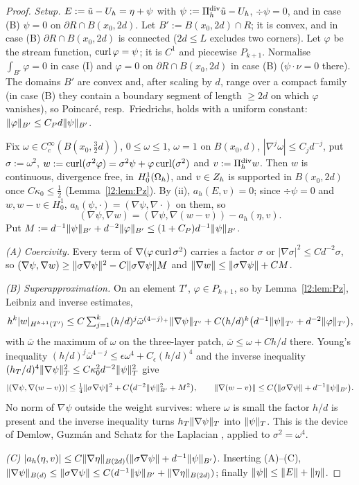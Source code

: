 \begin{proof}
\emph{Setup.} $E:=\tilde u-U_h=\eta+\psi$ with $\psi:=\Pi^{\rm div}_h\tilde u-U_h$, $\div\psi=0$, and in case (B) $\psi=0$ on $\partial R\cap B(x_0,2d)$. Let $B':=B(x_0,2d)\cap R$; it is convex, and in case (B) $\partial R\cap B(x_0,2d)$ is connected ($2d\le L$ excludes two corners). Let $\varphi$ be the stream function, $\operatorname{curl}\varphi=\psi$; it is $C^1$ and piecewise $P_{k+1}$. Normalise $\int_{B'}\varphi=0$ in case (I) and $\varphi=0$ on $\partial R\cap B(x_0,2d)$ in case (B) ($\psi\cdot\nu=0$ there). The domains $B'$ are convex and, after scaling by $d$, range over a compact family (in case (B) they contain a boundary segment of length $\ge2d$ on which $\varphi$ vanishes), so Poincar\'e, resp.\ Friedrichs, holds with a uniform constant: $\lVert \varphi\rVert_{B'}\le C_Pd\lVert \psi\rVert_{B'}$.

Fix $\omega\in C^\infty_c(B(x_0,\frac32d))$, $0\le\omega\le1$, $\omega=1$ on $B(x_0,d)$, $|\nabla^j\omega|\le C_jd^{-j}$, put $\sigma:=\omega^2$, $w:=\operatorname{curl}(\sigma^2\varphi)=\sigma^2\psi+\varphi\operatorname{curl}(\sigma^2)$ and $v:=\Pi^{\rm div}_hw$. Then $w$ is continuous, divergence free, in $H^1_0(\Omega_h)$, and $v\in Z_h$ is supported in $B(x_0,2d)$ once $C\kappa_0\le\frac12$ (Lemma~\ref{l2:lem:Pz}). By (ii), $a_h(E,v)=0$; since $\div\psi=0$ and $w,w-v\in H^1_0$, $a_h(\psi,\cdot)=(\nabla\psi,\nabla\cdot)$ on them, so
\[
(\nabla\psi,\nabla w)=(\nabla\psi,\nabla(w-v))-a_h(\eta,v).
\]
Put $M:=d^{-1}\lVert \psi\rVert_{B'}+d^{-2}\lVert \varphi\rVert_{B'}\le(1+C_P)d^{-1}\lVert \psi\rVert_{B'}$.

\emph{(A) Coercivity.} Every term of $\nabla(\varphi\operatorname{curl}\sigma^2)$ carries a factor $\sigma$ or $|\nabla\sigma|^2\le Cd^{-2}\sigma$, so $(\nabla\psi,\nabla w)\ge\lVert \sigma\nabla\psi\rVert^2-C\lVert \sigma\nabla\psi\rVert M$ and $\lVert \nabla w\rVert\le\lVert \sigma\nabla\psi\rVert+CM$.

\emph{(B) Superapproximation.} On an element $T'$, $\varphi\in P_{k+1}$, so by Lemma~\ref{l2:lem:Pz}, Leibniz and inverse estimates,
\[
h^k|w|_{H^{k+1}(T')}\le C\textstyle\sum_{j=1}^{k}(h/d)^j\bar\omega^{(4-j)_+}\lVert \nabla\psi\rVert_{T'}+C(h/d)^k\bigl(d^{-1}\lVert \psi\rVert_{T'}+d^{-2}\lVert \varphi\rVert_{T'}\bigr),
\]
with $\bar\omega$ the maximum of $\omega$ on the three-layer patch, $\bar\omega\le\omega+Ch/d$ there. Young's inequality $(h/d)^j\bar\omega^{4-j}\le\epsilon\omega^4+C_\epsilon(h/d)^4$ and the inverse inequality $(h_T/d)^4\lVert \nabla\psi\rVert_T^2\le C\kappa_0^2d^{-2}\lVert \psi\rVert_T^2$ give
\[
|(\nabla\psi,\nabla(w-v))|\le\tfrac14\lVert \sigma\nabla\psi\rVert^2+C\bigl(d^{-2}\lVert \psi\rVert_{B'}^2+M^2\bigr),\qquad \lVert \nabla(w-v)\rVert\le C\bigl(\lVert \sigma\nabla\psi\rVert+d^{-1}\lVert \psi\rVert_{B'}\bigr).
\]
No norm of $\nabla\psi$ outside the weight survives: where $\omega$ is small the factor $h/d$ is present and the inverse inequality turns $h_T\lVert \nabla\psi\rVert_T$ into $\lVert \psi\rVert_T$. This is the device of Demlow, Guzm\'an and Schatz for the Laplacian \cite{DemlowGuzmanSchatz2011}, applied to $\sigma^2=\omega^4$.

\emph{(C)} $|a_h(\eta,v)|\le C\lVert \nabla\eta\rVert_{B(2d)}(\lVert \sigma\nabla\psi\rVert+d^{-1}\lVert \psi\rVert_{B'})$. Inserting (A)--(C), $\lVert \nabla\psi\rVert_{B(d)}\le\lVert \sigma\nabla\psi\rVert\le C(d^{-1}\lVert \psi\rVert_{B'}+\lVert \nabla\eta\rVert_{B(2d)})$; finally $\lVert \psi\rVert\le\lVert E\rVert+\lVert \eta\rVert$.
\end{proof}

